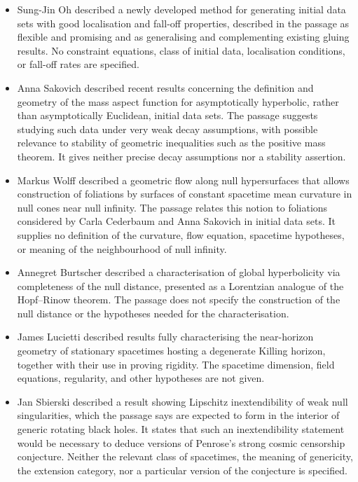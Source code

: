 \documentclass[11pt]{article}
\begin{document}
\begin{itemize}
\item Sung-Jin Oh described a newly developed method for generating initial data sets with good localisation and fall-off properties, described in the passage as flexible and promising and as generalising and complementing existing gluing results. No constraint equations, class of initial data, localisation conditions, or fall-off rates are specified.
\item Anna Sakovich described recent results concerning the definition and geometry of the mass aspect function for asymptotically hyperbolic, rather than asymptotically Euclidean, initial data sets. The passage suggests studying such data under very weak decay assumptions, with possible relevance to stability of geometric inequalities such as the positive mass theorem. It gives neither precise decay assumptions nor a stability assertion.
\item Markus Wolff described a geometric flow along null hypersurfaces that allows construction of foliations by surfaces of constant spacetime mean curvature in null cones near null infinity. The passage relates this notion to foliations considered by Carla Cederbaum and Anna Sakovich in initial data sets. It supplies no definition of the curvature, flow equation, spacetime hypotheses, or meaning of the neighbourhood of null infinity.
\item Annegret Burtscher described a characterisation of global hyperbolicity via completeness of the null distance, presented as a Lorentzian analogue of the Hopf--Rinow theorem. The passage does not specify the construction of the null distance or the hypotheses needed for the characterisation.
\item James Lucietti described results fully characterising the near-horizon geometry of stationary spacetimes hosting a degenerate Killing horizon, together with their use in proving rigidity. The spacetime dimension, field equations, regularity, and other hypotheses are not given.
\item Jan Sbierski described a result showing Lipschitz inextendibility of weak null singularities, which the passage says are expected to form in the interior of generic rotating black holes. It states that such an inextendibility statement would be necessary to deduce versions of Penrose's strong cosmic censorship conjecture. Neither the relevant class of spacetimes, the meaning of genericity, the extension category, nor a particular version of the conjecture is specified.
\end{itemize}
\end{document}
